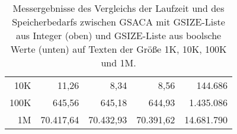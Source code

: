 \begin{table}[H]
\begin{tabular}{rrrrr}
10K                  & 11,26                          & 8,34                           & 8,56                           & 144.686                                                   \\
100K                 & 645,56                         & 645,18                         & 644,93                         & 1.435.086                                                 \\
1M                   & 70.417,64                      & 70.432,93                      & 70.391,62                      & 14.681.790                                               
\end{tabular}
\caption{Messergebnisse des Vergleichs der Laufzeit und des Speicherbedarfs zwischen GSACA mit GSIZE-Liste aus Integer (oben) und GSIZE-Liste aus boolsche Werte (unten) auf Texten der Größe 1K, 10K, 100K und 1M.}
\label{compare_gsize_results}
\end{table}